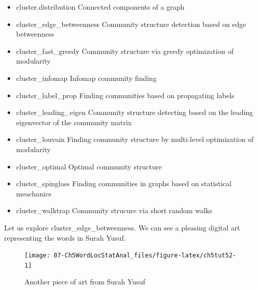 \documentclass[
]{article}
\newenvironment{Shaded}{\begin{snugshade}}{\end{snugshade}}
\newcommand{\AttributeTok}[1]{\textcolor[rgb]{0.13,0.29,0.53}{#1}}
\newcommand{\ConstantTok}[1]{\textcolor[rgb]{0.56,0.35,0.01}{#1}}
\newcommand{\DecValTok}[1]{\textcolor[rgb]{0.00,0.00,0.81}{#1}}
\newcommand{\FunctionTok}[1]{\textcolor[rgb]{0.13,0.29,0.53}{\textbf{#1}}}
\newcommand{\NormalTok}[1]{#1}
\newcommand{\OtherTok}[1]{\textcolor[rgb]{0.56,0.35,0.01}{#1}}
\newcommand{\SpecialCharTok}[1]{\textcolor[rgb]{0.81,0.36,0.00}{\textbf{#1}}}
\providecommand{\tightlist}{%
  \setlength{\itemsep}{0pt}\setlength{\parskip}{0pt}}
\begin{document}
\begin{itemize}
\tightlist
\item
  cluster.distribution Connected components of a graph
\item
  cluster\_edge\_betweenness Community structure detection based on edge betweenness
\item
  cluster\_fast\_greedy Community structure via greedy optimization of modularity
\item
  cluster\_infomap Infomap community finding
\item
  cluster\_label\_prop Finding communities based on propagating labels
\item
  cluster\_leading\_eigen Community structure detecting based on the leading eigenvector of the community matrix
\item
  cluster\_louvain Finding community structure by multi-level optimization of modularity
\item
  cluster\_optimal Optimal community structure
\item
  cluster\_spinglass Finding communities in graphs based on statistical meachanics
\item
  cluster\_walktrap Community strucure via short random walks
\end{itemize}

Let us explore cluster\_edge\_betweenness. We can see a pleasing digital art representing the words in Surah Yusuf.

\begin{Shaded}
\end{Shaded}

\begin{figure}

{\centering \texttt{[image: 07-Ch5WordLocStatAnal\_files/figure-latex/ch5tut52-1]} 

}

\caption{Another piece of art from Surah Yusuf}\label{fig:ch5tut52}
\end{figure}
\end{document}
